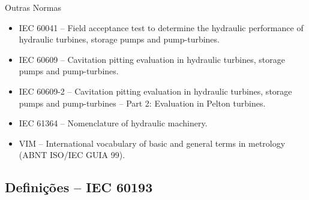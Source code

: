     \begin{frame}{Outras Normas}\vspace*{-1em}
        \begin{itemize}
            \item<1-> \alert{IEC 60041} -- Field acceptance test to determine the hydraulic
                performance of hydraulic turbines, storage pumps and pump-turbines.

            \item<1-> \alert{IEC 60609} -- Cavitation pitting evaluation in hydraulic turbines,
                storage pumps and pump-turbines.

            \item<1-> \alert{IEC 60609-2} -- Cavitation pitting evaluation in hydraulic
                turbines, storage pumps and pump-turbines – Part 2: Evaluation in Pelton
                turbines.

            \item<1-> \alert{IEC 61364} -- Nomenclature of hydraulic machinery.

            \item<1-> \alert{VIM} -- International vocabulary of basic and general terms in
                metrology (ABNT ISO/IEC GUIA 99).
        \end{itemize}
    \end{frame}

\subsection{Definições -- IEC 60193}


